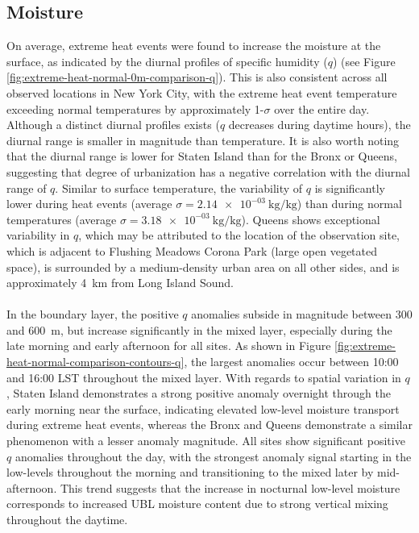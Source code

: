 \documentclass[11pt,a4paper]{article}
\begin{document}
\subsection{Moisture}
On average, extreme heat events were found to increase the moisture at the surface, as indicated by the diurnal profiles of specific humidity ($q$) (see Figure \ref{fig:extreme-heat-normal-0m-comparison-q}). This is also consistent across all observed locations in New York City, with the extreme heat event temperature exceeding normal temperatures by approximately 1-$\sigma$ over the entire day. Although a distinct diurnal profiles exists ($q$ decreases during daytime hours), the diurnal range is smaller in magnitude than temperature. It is also worth noting that the diurnal range is lower for Staten Island than for the Bronx or Queens, suggesting that degree of urbanization has a negative correlation with the diurnal range of $q$. Similar to surface temperature, the variability of $q$ is significantly lower during heat events (average $ \sigma = \SI{2.14e-03}{\kilo\gram\per\kilo\gram} $) than during normal temperatures (average $ \sigma = \SI{3.18e-03}{\kilo\gram\per\kilo\gram} $). Queens shows exceptional variability in $q$, which may be attributed to the location of the observation site, which is adjacent to Flushing Meadows Corona Park (large open vegetated space), is surrounded by a medium-density urban area on all other sides, and is approximately \SI{4}{\kilo\meter} from Long Island Sound. 
\\ \\
In the boundary layer, the positive $q$ anomalies subside in magnitude between 300 and \SI{600}{\meter}, but increase significantly in the mixed layer, especially during the late morning and early afternoon for all sites. As shown in Figure \ref{fig:extreme-heat-normal-comparison-contours-q}, the largest anomalies occur between 10:00 and 16:00 LST throughout the mixed layer. With regards to spatial variation in $q$, Staten Island demonstrates a strong positive anomaly overnight through the early morning near the surface, indicating elevated low-level moisture transport during extreme heat events, whereas the Bronx and Queens demonstrate a similar phenomenon with a lesser anomaly magnitude. All sites show significant positive $q$ anomalies throughout the day, with the strongest anomaly signal starting in the low-levels throughout the morning and transitioning to the mixed later by mid-afternoon. This trend suggests that the increase in nocturnal low-level moisture corresponds to increased UBL moisture content due to strong vertical mixing throughout the daytime.
\end{document}
